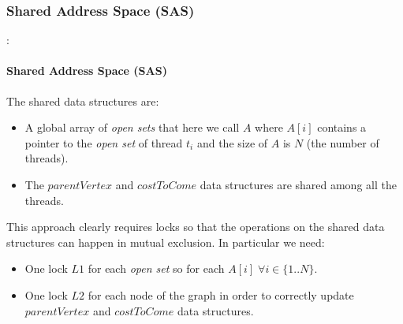 \documentclass[12pt]{beamer}
\begin{document}
	\subsubsection{Shared Address Space (SAS)}
	\begin{frame}{\secname : \subsecname}
		\framesubtitle{Shared Address Space (SAS)}
		The shared data structures are:
		\begin{itemize}
			\item A global array of \textit{open sets} that here we call $A$ where
				  $A[i]$ contains a pointer to the \textit{open set} of thread $t_i$ and the size
				  of $A$ is $N$ (the number of threads).
			\item The $parentVertex$ and $costToCome$ data structures are shared among all the threads.
		\end{itemize}
		This approach clearly requires locks so that the operations on the shared data structures
		can happen in mutual exclusion. In particular we need:
		\begin{itemize}
			\item One lock $L1$ for each \textit{open set} so for each $A[i] \;\forall i \in \{1..N\}$.
			\item One lock $L2$ for each node of the graph in order to correctly update $parentVertex$ and $costToCome$ data structures.
		\end{itemize}
	\end{frame}
\end{document}
